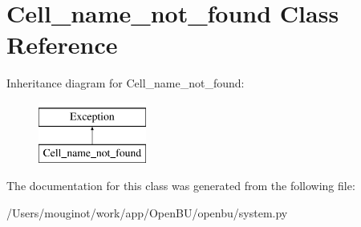 \hypertarget{classopenbu_1_1system_1_1_cell__name__not__found}{}\section{Cell\+\_\+name\+\_\+not\+\_\+found Class Reference}
\label{classopenbu_1_1system_1_1_cell__name__not__found}
Inheritance diagram for Cell\+\_\+name\+\_\+not\+\_\+found\+:\begin{figure}[H]
\begin{center}
\leavevmode
\includegraphics[height=2.000000cm]{classopenbu_1_1system_1_1_cell__name__not__found}
\end{center}
\end{figure}


The documentation for this class was generated from the following file\+:\begin{DoxyCompactItemize}
\item 
/\+Users/mouginot/work/app/\+Open\+B\+U/openbu/system.\+py\end{DoxyCompactItemize}
